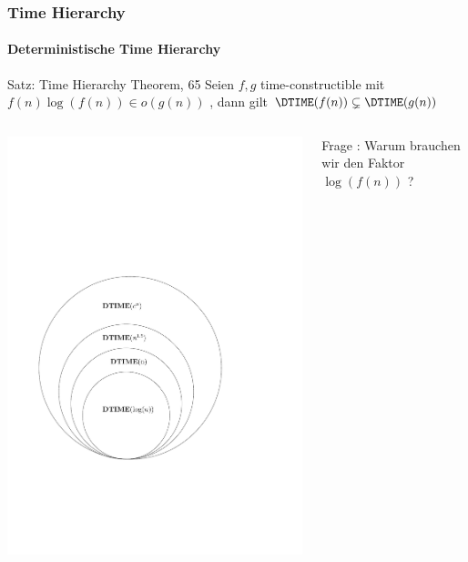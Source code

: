 \begin{frame}
	\frametitle{Time Hierarchy}
	\framesubtitle{Deterministische Time Hierarchy}
	
	\begin{KITinfoblock}{Satz: Time Hierarchy Theorem, 65}
	Seien $f, g$  time-constructible mit  
	$f(n)\log(f(n)) \in o(g(n))$ , dann gilt
	$\DTIME(f(n)) \subsetneq \DTIME(g(n))$
		
	\end{KITinfoblock}
	\bigskip
	\begin{columns}
	\includegraphics[scale=0.3]{images/timehierarchy.pdf}
		
	\pause
	Frage : Warum brauchen wir den Faktor $\log(f(n))$ ?
	\end{columns}
\end{frame}


